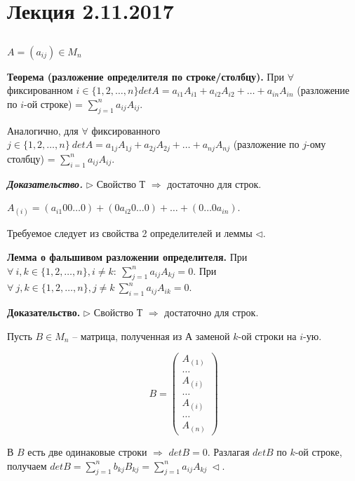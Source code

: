 \section{Лекция 2.11.2017}

\subsection{}

$A = (a_{ij}) \in M_n$

\bigskip
\textbf{Теорема (разложение определителя по строке/столбцу).} При $\forall$ фиксированном $i \in \{1, 2, \dots, n\} detA = a_{i1}A_{i1} + a_{i2}A_{i2} + \dots + a_{in}A_{in}$ (разложение по $i$-ой строке) = $\sum\limits_{j = 1}^n a_{ij}A_{ij}$.

Аналогично, для $\forall$ фиксированного $j \in \{1, 2, \dots, n\} \ detA = a_{1j}A_{1j} + a_{2j}A_{2j} + \dots + a_{nj}A_{nj}$ (разложение по $j$-ому столбцу) = $\sum\limits_{i = 1}^n a_{ij}A_{ij}$.

\bigskip
\textbf{\textit{Доказательство.}} $\rhd$ Свойство Т $\Rightarrow$ достаточно для строк. 

$A_{(i)} = (a_{i1} 00 \dots 0) + (0 a_{i2} 0 \dots 0) + \dots + (0 \dots 0 a_{in})$. 

Требуемое следует из свойства 2 определителей и леммы $\lhd$.

\bigskip
\textbf{Лемма о фальшивом разложении определителя.} При $\forall \ i, k \in \{1, 2, \dots, n\}, i \neq k: \ \sum\limits_{j = 1}^n a_{ij}A_{kj} = 0$. При $\forall \ j, k \in \{1, 2, \dots, n\}, j \neq k \ \sum\limits_{i = 1}^n a_{ij}A_{ik} = 0$.

\bigskip
\textbf{Доказательство.} $\rhd$ Свойство Т $\Rightarrow$ достаточно для строк.

Пусть $B \in M_n$ -- матрица, полученная из А заменой $k$-ой строки на $i$-ую.

\bigskip
\begin{equation*}B = \begin{pmatrix} A_{(1)} \\ \dots \\ A_{(i)} \\ \dots \\ A_{(i)} \\ \dots \\ A_{(n)} \end{pmatrix}
\end{equation*}

В $B$ есть две одинаковые строки $\Rightarrow$ $detB = 0$. Разлагая $detB$ по $k$-ой строке, получаем $detB = \sum\limits_{j = 1}^n b_{kj}B_{kj} = \sum\limits_{j = 1}^n a_{ij}A_{kj} \ \lhd$.

